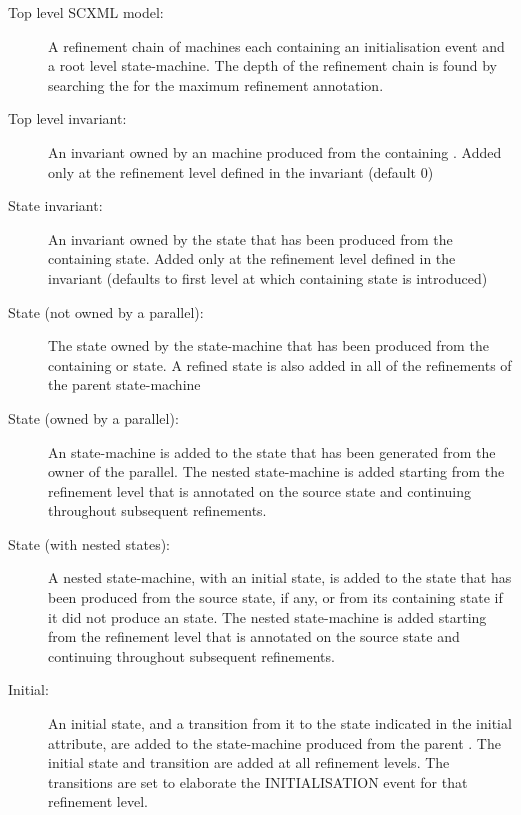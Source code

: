 \begin{description}
\item[Top level SCXML model:] A refinement chain of \EventB machines each containing an initialisation event and a root level \iUMLB state-machine. The depth of the refinement chain is found by searching the \SCXML for the maximum refinement annotation.

\item[Top level invariant:] An invariant owned by an \EventB machine produced from the containing \SCXML. Added only at the refinement level defined in the invariant (default 0) 

\item[State invariant:] An invariant owned by the \iUMLB state that has been produced from the containing \SCXML state. Added only at the refinement level defined in the invariant (defaults to first level at which containing \iUMLB state is introduced)

\item[State (not owned by a parallel):] The state owned by the \iUMLB state-machine that has been produced from the containing \SCXML or state. A refined state is also added in all of the refinements of the parent \iUMLB state-machine

\item[State (owned by a parallel):] An \iUMLB state-machine is added to the state that has been generated from the owner of the parallel. The nested \iUMLB state-machine is added starting from the refinement level that is annotated on the source state and continuing throughout subsequent refinements.

\item[State (with nested states):] A nested \iUMLB state-machine, with an initial state, is added to the \iUMLB state that has been produced from the source state, if any, or from its containing state if it did not produce an \iUMLB state. The nested \iUMLB state-machine is added starting from the refinement level that is annotated on the source state and continuing throughout subsequent refinements.

\item[Initial:] An \iUMLB initial state, and a transition from it to the \iUMLB state indicated in the \SCXML initial attribute, are added to the \iUMLB state-machine produced from the parent \SCXML. The \iUMLB initial state and \iUMLB transition are added at all refinement levels. The \iUMLB transitions are set to elaborate the \EventB INITIALISATION event for that refinement level.


\end{description}
